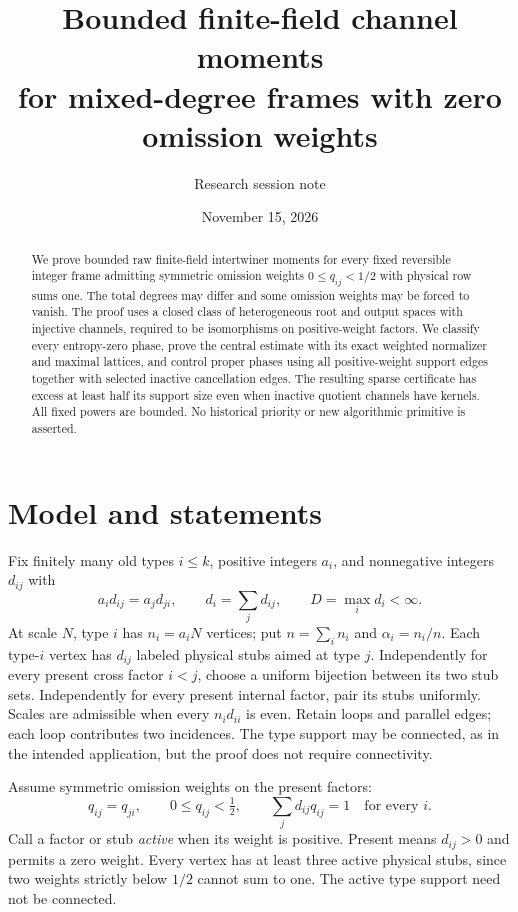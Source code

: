 \documentclass[11pt]{article}
\title{Bounded finite-field channel moments\\for mixed-degree frames with zero omission weights}
\author{Research session note}
\date{November 15, 2026}
\begin{document}
\maketitle
\begin{abstract}
We prove bounded raw finite-field intertwiner moments for every fixed reversible integer frame admitting symmetric omission weights $0\le q_{ij}<1/2$ with physical row sums one. The total degrees may differ and some omission weights may be forced to vanish. The proof uses a closed class of heterogeneous root and output spaces with injective channels, required to be isomorphisms on positive-weight factors. We classify every entropy-zero phase, prove the central estimate with its exact weighted normalizer and maximal lattices, and control proper phases using all positive-weight support edges together with selected inactive cancellation edges. The resulting sparse certificate has excess at least half its support size even when inactive quotient channels have kernels. All fixed powers are bounded. No historical priority or new algorithmic primitive is asserted.
\end{abstract}

\section{Model and statements}
Fix finitely many old types $i\le k$, positive integers $a_i$, and nonnegative integers $d_{ij}$ with
\[
 a_id_{ij}=a_jd_{ji},\qquad d_i=\sum_jd_{ij},\qquad D=\max_i d_i<\infty.
\]
At scale $N$, type $i$ has $n_i=a_iN$ vertices; put $n=\sum_i n_i$ and $\alpha_i=n_i/n$. Each type-$i$ vertex has $d_{ij}$ labeled physical stubs aimed at type $j$. Independently for every present cross factor $i<j$, choose a uniform bijection between its two stub sets. Independently for every present internal factor, pair its stubs uniformly. Scales are admissible when every $n_id_{ii}$ is even. Retain loops and parallel edges; each loop contributes two incidences. The type support may be connected, as in the intended application, but the proof does not require connectivity.

Assume symmetric omission weights on the present factors:
\begin{equation}\label{eq:q}
 q_{ij}=q_{ji},\qquad 0\le q_{ij}<\tfrac12,\qquad
 \sum_j d_{ij}q_{ij}=1\quad\text{for every }i.
\end{equation}
Call a factor or stub \emph{active} when its weight is positive. Present means $d_{ij}>0$ and permits a zero weight. Every vertex has at least three active physical stubs, since two weights strictly below $1/2$ cannot sum to one. The active type support need not be connected.
\end{document}
